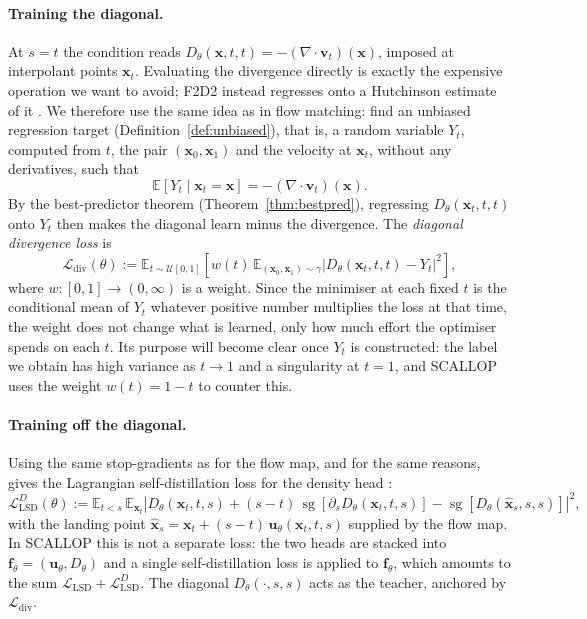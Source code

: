 \documentclass[11pt,a4paper]{article}
\numberwithin{equation}{section}     %
\theoremstyle{plain}        %
\theoremstyle{definition}   %
\theoremstyle{remark}       %
\begin{document}
\paragraph{Training the diagonal.} At $s=t$ the condition reads $D_\theta(\mathbf{x},t,t)=-(\nabla\cdot\mathbf{v}_t)(\mathbf{x})$, imposed at interpolant points $\mathbf{x}_t$. Evaluating the divergence directly is exactly the expensive operation we want to avoid; F2D2 instead regresses onto a Hutchinson estimate of it \citep{ai2026}. We therefore use the same idea as in flow matching: find an unbiased regression target (Definition~\ref{def:unbiased}), that is, a random variable $Y_t$, computed from $t$, the pair $(\mathbf{x}_0,\mathbf{x}_1)$ and the velocity at $\mathbf{x}_t$, without any derivatives, such that
\[
\mathbb{E}\left[Y_t\mid\mathbf{x}_t=\mathbf{x}\right]=-\left(\nabla\cdot\mathbf{v}_t\right)(\mathbf{x}) .
\]
By the best-predictor theorem (Theorem~\ref{thm:bestpred}), regressing $D_\theta(\mathbf{x}_t,t,t)$ onto $Y_t$ then makes the diagonal learn minus the divergence. The \emph{diagonal divergence loss} is
\[
\mathcal{L}_{\mathrm{div}}(\theta):=\mathbb{E}_{t\sim\mathcal{U}[0,1]}\left[w(t)\,\mathbb{E}_{(\mathbf{x}_0,\mathbf{x}_1)\sim\gamma}\left|D_\theta(\mathbf{x}_t,t,t)-Y_t\right|^2\right],
\]
where $w:[0,1]\to(0,\infty)$ is a weight. Since the minimiser at each fixed $t$ is the conditional mean of $Y_t$ whatever positive number multiplies the loss at that time, the weight does not change what is learned, only how much effort the optimiser spends on each $t$. Its purpose will become clear once $Y_t$ is constructed: the label we obtain has high variance as $t\to1$ and a singularity at $t=1$, and SCALLOP uses the weight $w(t)=1-t$ to counter this.

\paragraph{Training off the diagonal.} Using the same stop-gradients as for the flow map, and for the same reasons, gives the Lagrangian self-distillation loss for the density head \citep{ouyang2026}:
\[
\mathcal{L}^{D}_{\mathrm{LSD}}(\theta):=\mathbb{E}_{t<s}\,\mathbb{E}_{\mathbf{x}_t}\left|D_\theta(\mathbf{x}_t,t,s)+(s-t)\,\operatorname{sg}\left[\partial_sD_\theta(\mathbf{x}_t,t,s)\right]-\operatorname{sg}\left[D_\theta(\hat{\mathbf{x}}_s,s,s)\right]\right|^2,
\]
with the landing point $\hat{\mathbf{x}}_s=\mathbf{x}_t+(s-t)\,\mathbf{u}_\theta(\mathbf{x}_t,t,s)$ supplied by the flow map. In SCALLOP this is not a separate loss: the two heads are stacked into $\mathbf{f}_\theta=(\mathbf{u}_\theta,D_\theta)$ and a single self-distillation loss is applied to $\mathbf{f}_\theta$, which amounts to the sum $\mathcal{L}_{\mathrm{LSD}}+\mathcal{L}^{D}_{\mathrm{LSD}}$. The diagonal $D_\theta(\cdot,s,s)$ acts as the teacher, anchored by $\mathcal{L}_{\mathrm{div}}$.
\end{document}
